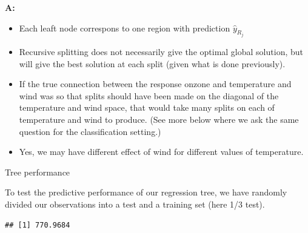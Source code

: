 \documentclass[10pt,ignorenonframetext,]{beamer}
\newenvironment{Shaded}{\begin{snugshade}}{\end{snugshade}}
\newcommand{\KeywordTok}[1]{\textcolor[rgb]{0.13,0.29,0.53}{\textbf{#1}}}
\newcommand{\DataTypeTok}[1]{\textcolor[rgb]{0.13,0.29,0.53}{#1}}
\newcommand{\DecValTok}[1]{\textcolor[rgb]{0.00,0.00,0.81}{#1}}
\newcommand{\StringTok}[1]{\textcolor[rgb]{0.31,0.60,0.02}{#1}}
\newcommand{\OperatorTok}[1]{\textcolor[rgb]{0.81,0.36,0.00}{\textbf{#1}}}
\newcommand{\NormalTok}[1]{#1}
\providecommand{\tightlist}{%
  \setlength{\itemsep}{0pt}\setlength{\parskip}{0pt}}
\begin{document}
\begin{frame}

\textbf{A:}

\begin{itemize}
\tightlist
\item
  Each leaft node correspons to one region with prediction
  \(\hat{y}_{R_j}\)
\item
  Recursive splitting does not necessarily give the optimal global
  solution, but will give the best solution at each split (given what is
  done previously).
\item
  If the true connection between the response onzone and temperature and
  wind was so that splits should have been made on the diagonal of the
  temperature and wind space, that would take many splits on each of
  temperature and wind to produce. (See more below where we ask the same
  question for the classification setting.)
\item
  Yes, we may have different effect of wind for different values of
  temperature.
\end{itemize}

\end{frame}

\begin{frame}[fragile]

\begin{block}{Tree performance}

To test the predictive performance of our regression tree, we have
randomly divided our observations into a test and a training set (here
1/3 test).

\begin{Shaded}
\end{Shaded}

\begin{verbatim}
## [1] 770.9684
\end{verbatim}

\end{block}

\end{frame}
\end{document}

